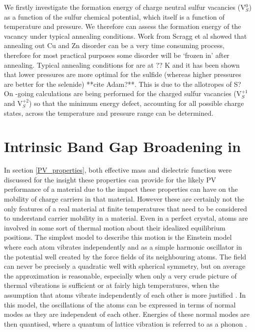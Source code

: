 We firstly investigate the formation energy of charge neutral sulfur vacancies (V$_{S}^{0}$) as a function of the sulfur chemical potential, which itself is a function of temperature and pressure. We therefore can assess the formation energy of the vacancy under typical annealing conditions. Work from Scragg et al showed that annealing out Cu and Zn disorder can be a very time consuming process, therefore for most practical purposes some disorder will be `frozen in' after annealing. Typical annealing conditions for { \CZTS } are at ?? K and it has been shown that lower pressures are more optimal for the sulfide (whereas higher pressures are better for the selenide) **cite Adam?**. This is due to the allotropes of S?\\
On -going calculations are being performed for the charged sulfur vacancies (V$_{S}^{+1}$ and V$_{S}^{+2}$) so that the minimum energy defect, accounting for all possible charge states, across the temperature and pressure range can be determined.





\section{Intrinsic Band Gap Broadening in {\CZTS}}\label{Eg_broadening_proj}
In section \ref{PV_properties}, both effective mass and dielectric function were discussed for the insight these properties can provide for the likely PV performance of a material due to the impact these properties can have on the mobility of charge carriers in that material. However these are certainly not the only features of a real material at finite temperatures that need to be considered to understand carrier mobility in a material. 
Even in a perfect crystal, atoms are involved in some sort of thermal motion about their idealized equilibrium positions. The simplest model to describe this motion is the Einstein model where each atom vibrates independently and as a simple harmonic oscillator in the potential well created by the force fields of its neighbouring atoms. The field can never be precisely a quadratic well with spherical symmetry, but on average the approximation is reasonable, especially when only a very crude picture of thermal vibrations is sufficient or at fairly high temperatures, when the assumption that atoms vibrate independently of each other is more justified \cite{Ziman_solids}. In this model, the oscillations of the atoms can be expressed in terms of normal modes as they are independent of each other. Energies of these normal modes are then quantised, where a quantum of lattice vibration is referred to as a phonon \cite{fund_semi}.

